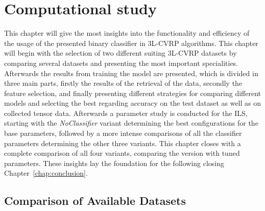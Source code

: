 \chapter{Computational study}
\label{chap:computational_study}
This chapter will give the most insights into the functionality and efficiency of the usage of the presented binary classifier in
\gls{3L-CVRP} algorithms. This chapter will begin with the selection of two different suiting \gls{3L-CVRP} datasets by comparing
several datasets and presenting the most important specialities. Afterwards the results from training the model are presented, which
is divided in three main parts, firstly the results of the retrieval of the data, secondly the feature selection, and finally presenting
different strategies for comparing different models and selecting the best regarding accuracy on the test dataset as well as on collected
tensor data. Afterwards a parameter study is conducted for the \gls{ILS}, starting with the \textit{NoClassifier} variant determining
the best configurations for the base parameters, followed by a more intense comparisons of all the classifier parameters determining the
other three variants. This chapter closes with a complete comparison of all four variants, comparing the version with tuned parameters.
These insights lay the foundation for the following closing Chapter~\ref{chap:conclusion}.

\section{Comparison of Available Datasets}
\label{sec:dataset_selection}


